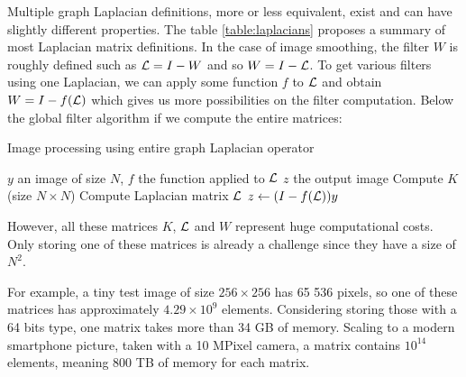 Multiple graph Laplacian definitions, more or less equivalent, exist and can have slightly different properties.
\ifthesis
The table \ref{table:laplacians} proposes a summary of most Laplacian matrix definitions.
\fi
In the case of image smoothing, the filter \(W\) is roughly defined such as \(\operatorname{\mathcal{L}} = I - W\) \cite{siam_slides_2016} and so \(W = I - \operatorname{\mathcal{L}}\).
To get various filters using one Laplacian, we can apply some function \(f\) to \(\operatorname{\mathcal{L}}\) and obtain \(W = I - f(\operatorname{\mathcal{L}})\) which gives us more possibilities on the filter computation.
Below the global filter algorithm if we compute the entire matrices:

\begin{algorithm}[H]
 \caption{Image processing using entire graph Laplacian operator}
 \begin{algorithmic}
  \REQUIRE \(y\) an image of size \(N\), \(f\) the function applied to \(\operatorname{\mathcal{L}}\)
  \ENSURE \(z\) the output image
  \STATE Compute \(K\) (size \(N \times N\))
  \STATE Compute Laplacian matrix \(\operatorname{\mathcal{L}}\)
  \STATE \(z \leftarrow (I - f(\operatorname{\mathcal{L}})) y\)
 \end{algorithmic}
\end{algorithm}

However, all these matrices \(K\), \(\operatorname{\mathcal{L}}\) and \(W\) represent huge computational costs.
Only storing one of these matrices is already a challenge since they have a size of \(N^2\).

For example, a tiny test image of size \(256 \times 256\) has 65 536 pixels, so one of these matrices has approximately \(4.29 \times 10^9\) elements.
Considering storing those with a 64 bits type, one matrix takes more than 34 GB of memory.
Scaling to a modern smartphone picture, taken with a 10 MPixel camera, a matrix contains \(10^{14}\) elements, meaning 800 TB of memory for each matrix.
